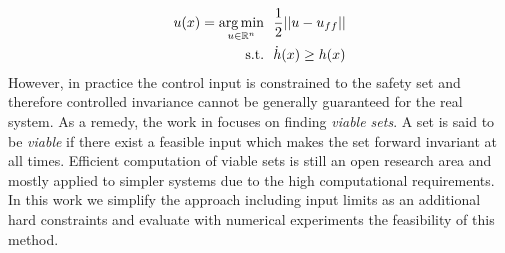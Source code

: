 \begin{align*}
    u(x) =\underset{u \in \mathbb{R}^{n}}{\arg\min} & \ \ \frac{1}{2} ||u - u_{ff}|| \\
     \text{s.t.} & \ \ \dot{h}(x) \geq h(x) 
\end{align*}
However, in practice the control input is constrained to the safety set and therefore controlled invariance cannot be generally guaranteed for the real system. As a remedy, the work in \cite{gurriet2018towards} focuses on finding \emph{viable sets}. A set is said to be \emph{viable} if there exist a feasible input which makes the set forward invariant at all times. Efficient computation of viable sets is still an open research area and mostly applied to simpler systems due to the high computational requirements. In this work we simplify the approach including input limits as an additional hard constraints and evaluate with numerical experiments the feasibility of this method. 

